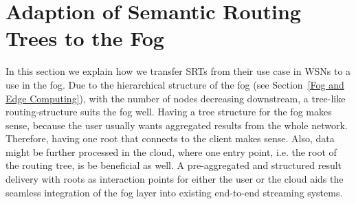 \section{Adaption of Semantic Routing Trees to the Fog}\label{Adaption of Semantic Routing Trees to the Fog}
  In this section we explain how we transfer SRTs from their use case in WSNs to a use in the fog. Due to the hierarchical structure of the fog (see Section~\ref{Fog and Edge Computing}), with the number of nodes decreasing downstream, a tree-like routing-structure suits the fog well. Having a tree structure for the fog makes sense, because the user usually wants aggregated results from the whole network. Therefore, having one root that connects to the client makes sense. Also, data might be further processed in the cloud, where one entry point, i.e. the root of the routing tree, is be beneficial as well. A pre-aggregated and structured result delivery with roots as interaction points for either the user or the cloud aids the seamless integration of the fog layer into existing end-to-end streaming systems.

